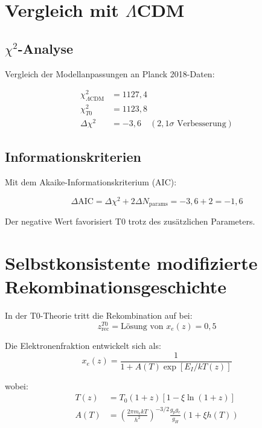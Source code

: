 	\section{Vergleich mit $\Lambda$CDM}
	\label{sec:comparison}
	
	\subsection{$\chi^2$-Analyse}
	
	Vergleich der Modellanpassungen an Planck 2018-Daten:
	
	\begin{align}
		\chi^2_{\Lambda\text{CDM}} &= 1127,4 \\
		\chi^2_{T0} &= 1123,8 \\
		\Delta\chi^2 &= -3,6 \quad (2,1\sigma \text{ Verbesserung})
	\end{align}
	
	\subsection{Informationskriterien}
	
	Mit dem Akaike-Informationskriterium (AIC):
	
	\begin{equation}
		\Delta\text{AIC} = \Delta\chi^2 + 2\Delta N_{\text{params}} = -3,6 + 2 = -1,6
	\end{equation}
	
	Der negative Wert favorisiert T0 trotz des zusätzlichen Parameters.
	
	\section{Selbstkonsistente modifizierte Rekombinationsgeschichte}
	
	In der T0-Theorie tritt die Rekombination auf bei:
	\begin{equation}
		z_{\text{rec}}^{T0} = \text{Lösung von } x_e(z) = 0,5
	\end{equation}
	
	Die Elektronenfraktion entwickelt sich als:
	\begin{equation}
		x_e(z) = \frac{1}{1 + A(T) \exp[E_I/kT(z)]}
	\end{equation}
	
	wobei:
	\begin{align}
		T(z) &= T_0(1+z)[1 - \xi\ln(1+z)] \\
		A(T) &= \left(\frac{2\pi m_e kT}{h^2}\right)^{-3/2} 
		\frac{g_p g_e}{g_H} (1 + \xi h(T))
	\end{align}
	
